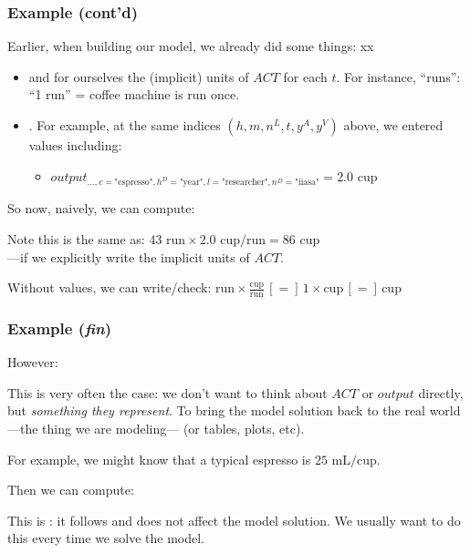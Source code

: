 \documentclass[12pt,aspectratio=169]{beamer}
\begin{document}
\begin{frame}
\frametitle{Example (cont'd)}

Earlier, when building our model, we already did some things: xx
\begin{itemize}
  \item {} and  for ourselves the (implicit) units of $ACT$ for each $t$.
  For instance, “runs”: “1 run” = coffee machine is run once.
  \item {}. For example, at the same indices $(h, m, n^L, t, y^A, y^V)$ above, we entered values including:
  \begin{itemize}
    \item $output_{\ldots, c = \text{"espresso"}, h^D = \text{"year"}, l = \text{"researcher"}, n^D = \text{"iiasa"}} = 2.0 \text{ cup}$
  \end{itemize}
\end{itemize}

\bigskip
So now, naively, we can compute: 

\bigskip
Note this is the same as: $43 \text { run} \times 2.0 \text{ cup/run} = 86 \text{ cup}$ \\
—if we explicitly write the implicit units of $ACT$.

\smallskip
Without values, we can write/check: $\text{run} \times \frac{\text{cup}}{\text{run}} \,[ = ]\, 1 \times \text{cup} \,[ = ]\, \text{cup}$

\end{frame}

\begin{frame}
\frametitle{Example (\emph{fin})}
However: 

\bigskip
This is very often the case: we don't want to think about $ACT$ or $output$ directly, but \emph{something they represent}.
To bring the model solution back to the real world—the thing we are modeling— (or tables, plots, etc).

\bigskip
For example, we might know that a typical espresso is $25 \text{ mL/cup}$.

\smallskip
Then we can compute: 

\bigskip
This is : it follows and does not affect the model solution.
We usually want to do this every time we solve the model.

\end{frame}
\end{document}
